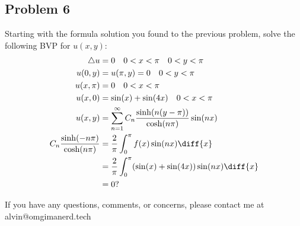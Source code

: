 \documentclass{math}
\begin{document}
\subsection*{Problem 6}
Starting with the formula solution you found to the previous problem, solve
the following BVP for \( u(x,y) \):
\begin{align*}
  \triangle u &= 0 \quad 0<x<\pi \quad 0<y<\pi \\
  u(0,y) &= u(\pi,y) = 0 \quad 0<y<\pi \\
  u(x,\pi) &= 0 \quad 0<x<\pi \\
  u(x,0) &= \sin(x)+\sin(4x) \quad 0<x<\pi \\
  u(x,y) &= \sum_{n=1}^{\infty}C_n
    \frac{\sinh(n(y-\pi))}{\cosh(n\pi)}\sin(nx) \\
  C_n\frac{\sinh(-n\pi)}{\cosh(n\pi)} &=
    \frac{2}{\pi}\int_{0}^{\pi}f(x)\sin(nx)\diff{x} \\
  &= \frac{2}{\pi}\int_{0}^{\pi}(\sin(x)+\sin(4x))\sin(nx)\diff{x} \\
  &= 0?
\end{align*}

\begin{center}
  If you have any questions, comments, or concerns, please contact me at
  alvin@omgimanerd.tech
\end{center}
\end{document}
